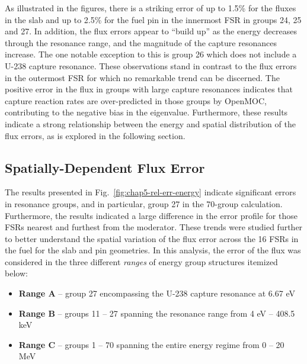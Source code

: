 As illustrated in the figures, there is a striking error of up to 1.5\% for the fluxes in the slab and up to 2.5\% for the fuel pin in the innermost \ac{FSR} in groups 24, 25 and 27. In addition, the flux errors appear to ``build up'' as the energy decreases through the resonance range, and the magnitude of the capture resonances increase. The one notable exception to this is group 26 which does not include a U-238 capture resonance. These observations stand in contrast to the flux errors in the outermost \ac{FSR} for which no remarkable trend can be discerned. The positive error in the flux in groups with large capture resonances indicates that capture reaction rates are over-predicted in those groups by OpenMOC, contributing to the negative bias in the eigenvalue. Furthermore, these results indicate a strong relationship between the energy and spatial distribution of the flux errors, as is explored in the following section.


\subsection{Spatially-Dependent Flux Error}
\label{subsec:chap5-diagnosis-space}

The results presented in Fig.~\ref{fig:chap5-rel-err-energy} indicate significant errors in resonance groups, and in particular, group 27 in the 70-group calculation. Furthermore, the results indicated a large difference in the error profile for those \ac{FSR}s nearest and furthest from the moderator. These trends were studied further to better understand the spatial variation of the flux error across the 16 \ac{FSR}s in the fuel for the slab and pin geometries. In this analysis, the error of the flux was considered in the three different \textit{ranges} of energy group structures itemized below:

\vspace{-0.15cm}
\begin{itemize}[noitemsep]
  \item {\bf Range A} -- group 27 encompassing the U-238 capture resonance at 6.67 eV
  \item {\bf Range B} -- groups 11 -- 27 spanning the resonance range from 4 eV -- 408.5 keV
  \item {\bf Range C} -- groups 1 -- 70 spanning the entire energy regime from 0 -- 20 MeV
\end{itemize}
\vspace{-0.15cm}

